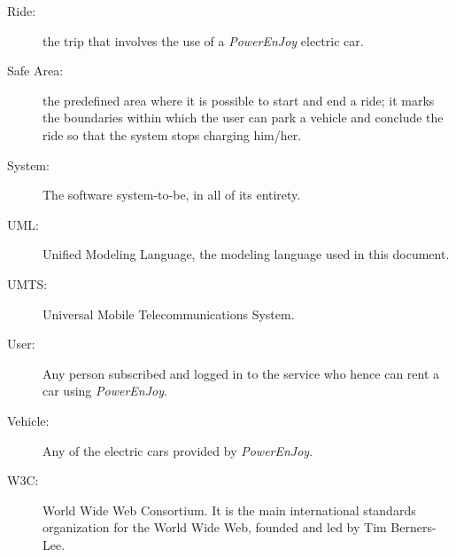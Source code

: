 \begin{description}
\item[Ride:] the trip that involves the use of a \emph{PowerEnJoy} electric car.
\item[Safe Area:] the predefined area where it is possible to start and end a ride; it marks the boundaries within which the user can park a vehicle and conclude the ride so that the system stops charging him/her.
\item[System:] The software system-to-be, in all of its entirety.
\item[UML:] Unified Modeling Language, the modeling language used in this document.
\item[UMTS:] Universal Mobile Telecommunications System.
\item[User:] Any person subscribed and logged in to the service who hence can rent a car using \hbox{\emph{PowerEnJoy}}.
\item[Vehicle:] Any of the electric cars provided by \emph{PowerEnJoy}.
\item[W3C:] World Wide Web Consortium. It is the main international standards organization for the World Wide Web, founded and led by Tim Berners-Lee.
\end{description}

